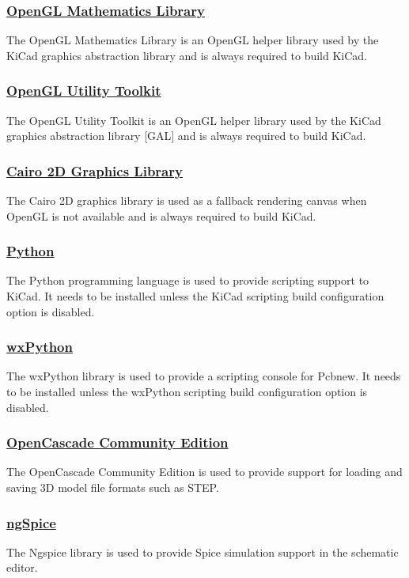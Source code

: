 \documentclass[12pt,a4paper]{report}
\begin{document}
\subsubsection{\href{http://glm.g-truc.net/}{OpenGL Mathematics Library}}
The OpenGL Mathematics Library is an OpenGL helper library used by the KiCad graphics abstraction library and is always required to build KiCad.
\subsubsection{\href{https://www.opengl.org/resources/libraries/glut/}{OpenGL Utility Toolkit}}
The OpenGL Utility Toolkit is an OpenGL helper library used by the KiCad graphics abstraction library [GAL] and is always required to build KiCad.
\subsubsection{\href{http://cairographics.org/}{Cairo 2D Graphics Library}}
The Cairo 2D graphics library is used as a fallback rendering canvas when OpenGL is not available and is always required to build KiCad.
\subsubsection{\href{http://www.python.org/}{Python}}
The Python programming language is used to provide scripting support to KiCad. It needs to be installed unless the KiCad scripting build configuration option is disabled.
\subsubsection{\href{http://wxpython.org/}{wxPython}}
The wxPython library is used to provide a scripting console for Pcbnew. It needs to be installed unless the wxPython scripting build configuration option is disabled.
\subsubsection{\href{https://github.com/tpaviot/oce}{OpenCascade Community Edition}}
The OpenCascade Community Edition is used to provide support for loading and saving 3D model file formats such as STEP.
\subsubsection{\href{https://ngspice.sourceforge.net/}{ngSpice}}
The Ngspice library is used to provide Spice simulation support in the schematic editor.
\end{document}
